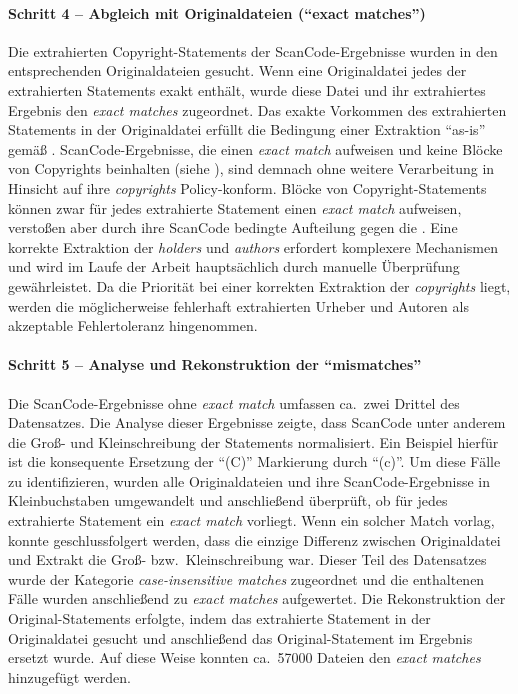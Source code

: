 \paragraph{Schritt 4 -- Abgleich mit Originaldateien (\enquote{exact matches})}
Die extrahierten Copyright-Statements der ScanCode-Ergebnisse wurden in den entsprechenden Originaldateien gesucht.
Wenn eine Originaldatei jedes der extrahierten Statements exakt enthält, wurde diese Datei und ihr extrahiertes Ergebnis den \textit{exact matches} zugeordnet.
Das exakte Vorkommen des extrahierten Statements in der Originaldatei erfüllt die Bedingung einer Extraktion \enquote{as-is} gemäß .
ScanCode-Ergebnisse, die einen \textit{exact match} aufweisen und keine Blöcke von Copyrights beinhalten (siehe ), sind demnach ohne weitere Verarbeitung in Hinsicht auf ihre \textit{copyrights} Policy-konform.
Blöcke von Copyright-Statements können zwar für jedes extrahierte Statement einen \textit{exact match} aufweisen, verstoßen aber durch ihre ScanCode bedingte Aufteilung gegen die .
Eine korrekte Extraktion der \textit{holders} und \textit{authors} erfordert komplexere Mechanismen und wird im Laufe der Arbeit hauptsächlich durch manuelle Überprüfung gewährleistet.
Da die Priorität bei einer korrekten Extraktion der \textit{copyrights} liegt, werden die möglicherweise fehlerhaft extrahierten Urheber und Autoren als akzeptable Fehlertoleranz hingenommen.

\paragraph{Schritt 5 -- Analyse und Rekonstruktion der \enquote{mismatches}}
Die ScanCode-Ergebnisse ohne \textit{exact match} umfassen ca.\ zwei Drittel des Datensatzes.
Die Analyse dieser Ergebnisse zeigte, dass ScanCode unter anderem die Groß- und Kleinschreibung der Statements normalisiert.
Ein Beispiel hierfür ist die konsequente Ersetzung der \enquote{(C)} Markierung durch \enquote{(c)}.
Um diese Fälle zu identifizieren, wurden alle Originaldateien und ihre ScanCode-Ergebnisse in Kleinbuchstaben umgewandelt und anschließend überprüft, ob für jedes extrahierte Statement ein \textit{exact match} vorliegt.
Wenn ein solcher Match vorlag, konnte geschlussfolgert werden, dass die einzige Differenz zwischen Originaldatei und Extrakt die Groß- bzw.\ Kleinschreibung war.
Dieser Teil des Datensatzes wurde der Kategorie \textit{case-insensitive matches} zugeordnet und die enthaltenen Fälle wurden anschließend zu \textit{exact matches} aufgewertet.
Die Rekonstruktion der Original-Statements erfolgte, indem das extrahierte Statement in der Originaldatei gesucht und anschließend das Original-Statement im Ergebnis ersetzt wurde.
Auf diese Weise konnten ca.\ \num{57000} Dateien den \textit{exact matches} hinzugefügt werden.

